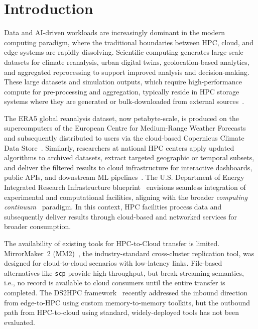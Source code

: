 \documentclass[runningheads]{llncs}
\begin{document}
\section{Introduction}
\label{sec:intro}

Data and AI-driven workloads are increasingly dominant in the modern computing paradigm, where the traditional boundaries between HPC, cloud, and edge systems are rapidly dissolving. Scientific computing generates large-scale datasets for climate reanalysis, urban digital twins, geolocation-based analytics, and aggregated reprocessing to support improved analysis and decision-making. These large datasets and simulation outputs, which require high-performance compute for pre-processing and aggregation, typically reside in HPC storage systems where they are generated or bulk-downloaded from external sources~\cite{varghese2018next,buyya2018manifesto}. 

The ERA5 global reanalysis dataset, now petabyte-scale, is produced on the supercomputers of the European Centre for Medium-Range Weather Forecasts and subsequently distributed to users via the cloud-based Copernicus Climate Data Store~\cite{hersbach2020era5}. Similarly, researchers at national HPC centers apply updated algorithms to archived datasets, extract targeted geographic or temporal subsets, and deliver the filtered results to cloud infrastructure for interactive dashboards, public APIs, and downstream ML pipelines~\cite{extract2023,lclstream2025}. The U.S. Department of Energy Integrated Research Infrastructure blueprint~\cite{miller2023iri} envisions seamless integration of experimental and computational facilities, aligning with the broader \emph{computing continuum}~\cite{balouek2019continuum} paradigm. In this context, HPC facilities process data and subsequently deliver results through cloud-based and networked services for broader consumption.


The availability of existing tools for HPC-to-Cloud transfer is limited. MirrorMaker~2 (MM2)~\cite{mm2kafka}, the industry-standard cross-cluster replication tool, was designed for cloud-to-cloud scenarios with low-latency links. File-based alternatives like \texttt{scp} provide high throughput, but break streaming semantics, i.e., no record is available to cloud consumers until the entire transfer is completed. The DS2HPC framework~\cite{ds2hpc2025} recently addressed the inbound direction from edge-to-HPC using custom memory-to-memory toolkits, but the outbound path from HPC-to-cloud using standard, widely-deployed tools has not been evaluated.
\end{document}
